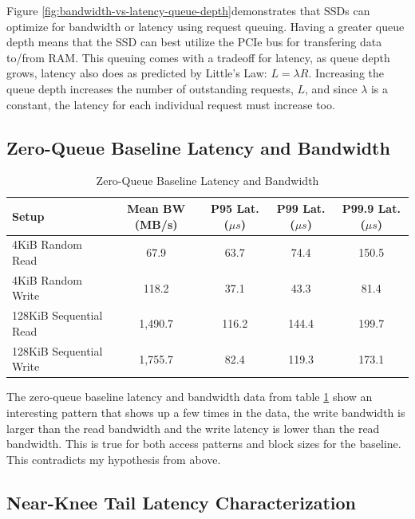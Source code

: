 \documentclass[11pt]{article}
\begin{document}
Figure \ref{fig:bandwidth-vs-latency-queue-depth}demonstrates that SSDs can optimize for bandwidth or latency using
request queuing. Having a greater queue depth means that the SSD can best utilize the PCIe bus for transfering data
to/from RAM. This queuing comes with a tradeoff for latency, as queue depth grows, latency also does as predicted by
Little's Law: $L = \lambda R$. Increasing the queue depth increases the number of outstanding requests, $L$, and since
$\lambda$ is a constant, the latency for each individual request must increase too.

\subsection{Zero-Queue Baseline Latency and Bandwidth}

\begin{table}[H]
	\centering
	\caption{Zero-Queue Baseline Latency and Bandwidth}
	\label{tab:zero-queue-baseline}
	\begin{tabular}{@{}lcccc@{}}
		\toprule
		Setup                   & Mean BW (MB/s) & P95 Lat. ($\mu s$) & P99 Lat. ($\mu s$) & P99.9 Lat. ($\mu s$) \\
		\midrule
		4KiB Random Read        & 67.9           & 63.7               & 74.4               & 150.5                \\
		4KiB Random Write       & 118.2          & 37.1               & 43.3               & 81.4                 \\
		128KiB Sequential Read  & 1,490.7        & 116.2              & 144.4              & 199.7                \\
		128KiB Sequential Write & 1,755.7        & 82.4               & 119.3              & 173.1                \\
		\bottomrule
	\end{tabular}
\end{table}

The zero-queue baseline latency and bandwidth data from table \ref{tab:zero-queue-baseline} show an interesting pattern
that shows up a few times in the data, the write bandwidth is larger than the read bandwidth and the write latency is
lower than the read bandwidth. This is true for both access patterns and block sizes for the baseline. This contradicts
my hypothesis from above.

\subsection{Near-Knee Tail Latency Characterization}
\end{document}
